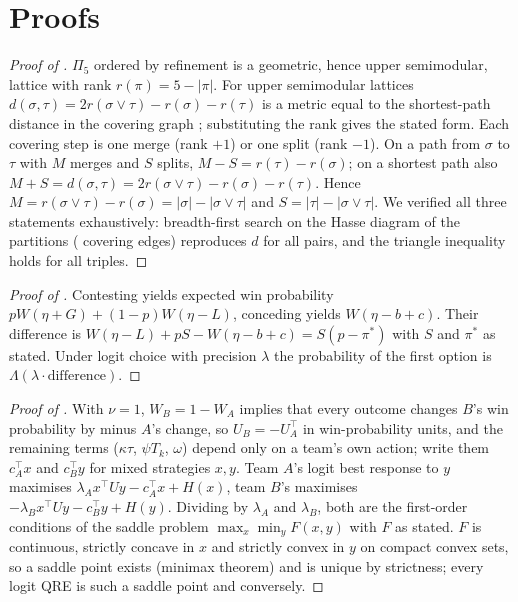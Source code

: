 
\section{Proofs}
\label{app:proofs}

\begin{proof}[Proof of ]
$\Pi_5$ ordered by refinement is a geometric, hence upper semimodular, lattice with rank $r(\pi)=5-|\pi|$.
For upper semimodular lattices $d(\sigma,\tau)=2r(\sigma\vee\tau)-r(\sigma)-r(\tau)$ is a metric equal to the shortest-path distance in the covering graph \citep{monjardet1981metrics}; substituting the rank gives the stated form.
Each covering step is one merge (rank $+1$) or one split (rank $-1$). On a path from $\sigma$ to $\tau$ with $M$ merges and $S$ splits, $M-S=r(\tau)-r(\sigma)$; on a shortest path also $M+S=d(\sigma,\tau)=2r(\sigma\vee\tau)-r(\sigma)-r(\tau)$. Hence $M=r(\sigma\vee\tau)-r(\sigma)=|\sigma|-|\sigma\vee\tau|$ and $S=|\tau|-|\sigma\vee\tau|$.
We verified all three statements exhaustively: breadth-first search on the Hasse diagram of the  partitions ( covering edges) reproduces $d$ for all pairs, and the triangle inequality holds for all triples.
\end{proof}

\begin{proof}[Proof of ]
Contesting yields expected win probability $pW(\eta+G)+(1-p)W(\eta-L)$, conceding yields $W(\eta-b+c)$.
Their difference is $W(\eta-L)+pS-W(\eta-b+c)=S(p-\pi^*)$ with $S$ and $\pi^*$ as stated.
Under logit choice with precision $\lambda$ the probability of the first option is $\Lambda(\lambda\cdot\text{difference})$.
\end{proof}

\begin{proof}[Proof of ]
With $\nu=1$, $W_B=1-W_A$ implies that every outcome changes $B$'s win probability by minus $A$'s change, so $U_B=-U_A^\top$ in win-probability units, and the remaining terms ($\kappa\tau$, $\psi T_k$, $\omega$) depend only on a team's own action; write them $c_A^\top x$ and $c_B^\top y$ for mixed strategies $x,y$.
Team $A$'s logit best response to $y$ maximises $\lambda_A x^\top Uy-c_A^\top x+H(x)$, team $B$'s maximises $-\lambda_B x^\top Uy-c_B^\top y+H(y)$.
Dividing by $\lambda_A$ and $\lambda_B$, both are the first-order conditions of the saddle problem $\max_x\min_y F(x,y)$ with $F$ as stated.
$F$ is continuous, strictly concave in $x$ and strictly convex in $y$ on compact convex sets, so a saddle point exists (minimax theorem) and is unique by strictness; every logit QRE is such a saddle point and conversely.
\end{proof}

